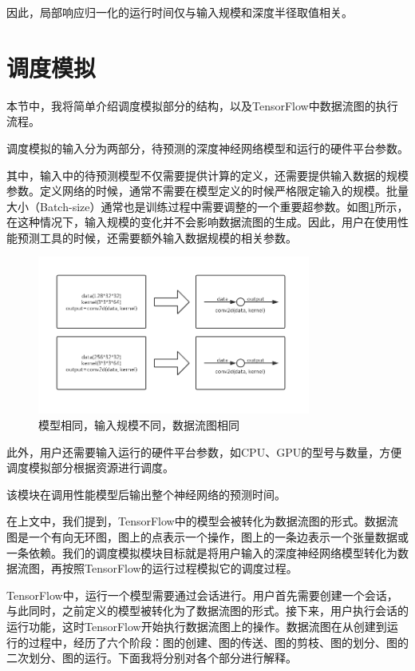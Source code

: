     因此，局部响应归一化的运行时间仅与输入规模和深度半径取值相关。

\section{调度模拟}
    本节中，我将简单介绍调度模拟部分的结构，以及TensorFlow中数据流图的执行流程。

    调度模拟的输入分为两部分，待预测的深度神经网络模型和运行的硬件平台参数。
    
    其中，输入中的待预测模型不仅需要提供计算的定义，还需要提供输入数据的规模参数。定义网络的时候，通常不需要在模型定义的时候严格限定输入的规模。批量大小（Batch-size）通常也是训练过程中需要调整的一个重要超参数。如图\ref{fig:dag_same}所示，在这种情况下，输入规模的变化并不会影响数据流图的生成。因此，用户在使用性能预测工具的时候，还需要额外输入数据规模的相关参数。

    \begin{figure}[!htbp]
        \centering
        \includegraphics[width=0.8\textwidth]{figures/dag_same.jpg}
        \caption{模型相同，输入规模不同，数据流图相同}
        \label{fig:dag_same}
    \end{figure}

    此外，用户还需要输入运行的硬件平台参数，如CPU、GPU的型号与数量，方便调度模拟部分根据资源进行调度。
    
    该模块在调用性能模型后输出整个神经网络的预测时间。

    在上文中，我们提到，TensorFlow中的模型会被转化为数据流图的形式。数据流图是一个有向无环图，图上的点表示一个操作，图上的一条边表示一个张量数据或一条依赖。我们的调度模拟模块目标就是将用户输入的深度神经网络模型转化为数据流图，再按照TensorFlow的运行过程模拟它的调度过程。

    TensorFlow中，运行一个模型需要通过会话进行。用户首先需要创建一个会话，与此同时，之前定义的模型被转化为了数据流图的形式。接下来，用户执行会话的运行功能，这时TensorFlow开始执行数据流图上的操作。数据流图在从创建到运行的过程中，经历了六个阶段：图的创建、图的传送、图的剪枝、图的划分、图的二次划分、图的运行。下面我将分别对各个部分进行解释。

